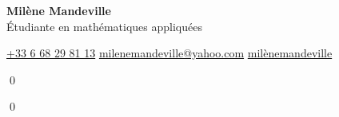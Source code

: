 \documentclass[10pt]{article}
\begin{document}
\pagestyle{empty}
\begin{center}
    {\textbf{\huge Milène Mandeville}}\\\Large{Étudiante en mathématiques appliquées}\vspace{3mm}
\end{center}
\begin{center}
     \href{https://wa.link/fxuzgz}{+33 6 68 29 81 13} \hspace{1cm}
     \href{mailto:milenemandeville@yahoo.com}{milenemandeville@yahoo.com} \hspace{1cm}
     \href{https://www.linkedin.com/in/milènemandeville}{milènemandeville}\vspace{3mm}
\end{center}



\begin{minipage}[t]{0.45\linewidth}





\end{minipage}\hfill













\qed


\qed
\end{document}
